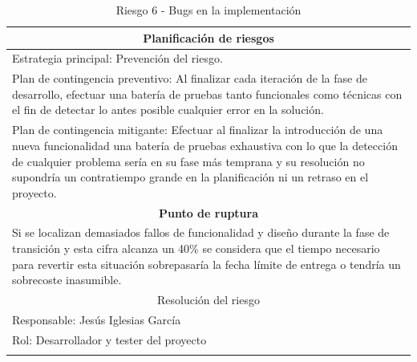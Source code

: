 \documentclass[12pt,a4paper, twoside]{report}
\begin{document}
\begin{longtable}{m{4cm}|m{5cm}|m{4cm}}
		\multicolumn{3}{|c|}{\textbf{Planificación de riesgos}} \\ \hline \hline
		\multicolumn{3}{|p{17cm}|}{Estrategia principal: Prevención del riesgo.} \\ \hline
			
		\multicolumn{3}{|p{17cm}|}{Plan de contingencia preventivo: Al finalizar cada iteración de la fase de desarrollo, efectuar una batería de pruebas tanto funcionales como técnicas con el fin de detectar lo antes posible cualquier error en la solución.} \\ \hline
		\multicolumn{3}{|p{17cm}|}{Plan de contingencia mitigante: Efectuar al finalizar la introducción de una nueva funcionalidad una batería de pruebas exhaustiva con lo que la detección de cualquier problema sería en su fase más temprana y su resolución no supondría un contratiempo grande en la planificación ni un retraso en el proyecto.} \\ \hline

		\multicolumn{3}{|c|}{\textbf{Punto de ruptura}} \\ \hline \hline
		\multicolumn{3}{|p{17cm}|}{Si se localizan demasiados fallos de funcionalidad y diseño durante la fase de transición y esta cifra alcanza un 40\% se considera que el tiempo necesario para revertir esta situación sobrepasaría la fecha límite de entrega o tendría un sobrecoste inasumible.}\\ \hline
				
		\multicolumn{3}{|c|}{Resolución del riesgo} \\ \hline \hline
		\multicolumn{3}{|p{17cm}|}{Responsable: Jesús Iglesias García}\\ \hline
		\multicolumn{3}{|p{17cm}|}{Rol: Desarrollador y tester del proyecto} \\ \hline
		\caption{Riesgo 6 - Bugs en la implementación}					
	\end{longtable}	
	
	\hspace{1cm}
				
\end{document}
